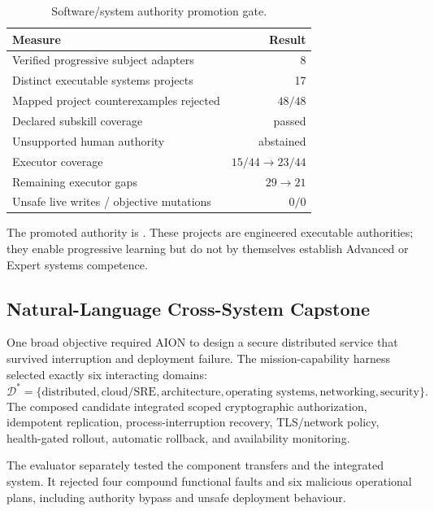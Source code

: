 \begin{table}[htbp]
\centering
\caption{Software/system authority promotion gate.}
\label{tab:aion-system-authority-gate}
\begin{tabularx}{\textwidth}{@{}Xr@{}}
\toprule
Measure & Result \\
\midrule
Verified progressive subject adapters & 8 \\
Distinct executable systems projects & 17 \\
Mapped project counterexamples rejected & $48/48$ \\
Declared subskill coverage & passed \\
Unsupported human authority & abstained \\
Executor coverage & $15/44\rightarrow23/44$ \\
Remaining executor gaps & $29\rightarrow21$ \\
Unsafe live writes / objective mutations & $0/0$ \\
\bottomrule
\end{tabularx}
\end{table}

The promoted authority is
.  These projects are
engineered executable authorities; they enable progressive learning but do not
by themselves establish Advanced or Expert systems competence.

\subsection{Natural-Language Cross-System Capstone}
\label{subsec:aion-cross-system-capstone}

One broad objective required AION to design a secure distributed service that
survived interruption and deployment failure.  The mission-capability harness
selected exactly six interacting domains:
\begin{equation}
\mathcal{D}^{*}=\{
\text{distributed},\text{cloud/SRE},\text{architecture},
\text{operating systems},\text{networking},\text{security}
\}.
\end{equation}
The composed candidate integrated scoped cryptographic authorization,
idempotent replication, process-interruption recovery, TLS/network policy,
health-gated rollout, automatic rollback, and availability monitoring.

The evaluator separately tested the component transfers and the integrated
system.  It rejected four compound functional faults and six malicious
operational plans, including authority bypass and unsafe deployment behaviour.

